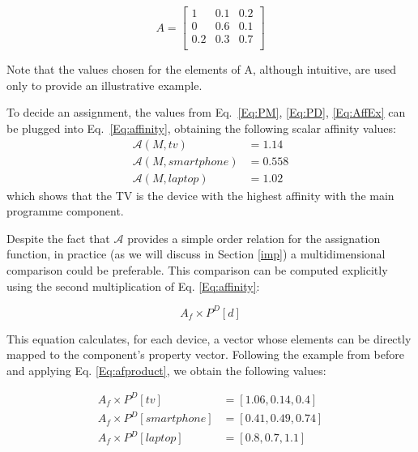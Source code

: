 \begin{equation}\label{Eq:AffEx}
A = 
\begin{bmatrix}
1 & 0.1 & 0.2 \\
0 & 0.6 & 0.1 \\
0.2 & 0.3 & 0.7 \\ 
\end{bmatrix}
\end{equation}

Note that the values chosen for the elements of A, although intuitive, are used only to provide an illustrative example.

To decide an assignment, the values from Eq.~\ref{Eq:PM}, \ref{Eq:PD}, \ref{Eq:AffEx} can be plugged into Eq.~\ref{Eq:affinity}, obtaining the following scalar affinity values:
\begin{equation} \label{eq:exampleassign}
\begin{split}
\mathcal{A}(M,tv) & = 1.14 \\
\mathcal{A}(M,smartphone) & = 0.558 \\
\mathcal{A}(M,laptop) & = 1.02
\end{split}
\end{equation}
which shows that the TV is the device with the highest affinity with the main programme component.

Despite the fact that $\mathcal{A}$ provides a simple order relation for the assignation function, in practice (as we will discuss in Section \ref{imp}) a multidimensional comparison could be preferable.
This comparison can be computed explicitly using the second multiplication of Eq. \ref{Eq:affinity}:

\begin{equation} \label{Eq:afproduct}
A_{f} \times P^D[d]
\end{equation}

This equation calculates, for each device, a vector whose elements can be directly mapped to the component's property vector. Following the example from before and applying Eq. \ref{Eq:afproduct}, we obtain the following values:

\begin{equation} \label{Eq:afproductExample}
\begin{split}
A_{f} \times P^D[tv] & = [1.06, 0.14, 0.4]  \\
A_{f} \times P^D[smartphone] & = [0.41, 0.49, 0.74] \\
A_{f} \times P^D[laptop] & = [0.8, 0.7, 1.1] 
\end{split}
\end{equation}

